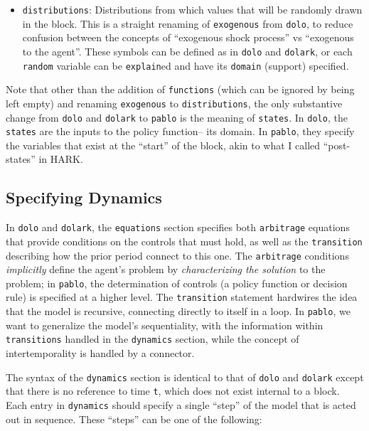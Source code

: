\documentclass[12pt,pdftex,letterpaper]{article}
\begin{document}
\begin{itemize}
	\item \texttt{distributions}: Distributions from which values that will be randomly drawn in the block. This is a straight renaming of \texttt{exogenous} from \texttt{dolo}, to reduce confusion between the concepts of ``exogenous shock process'' vs ``exogenous to the agent''. These symbols can be defined as in \texttt{dolo} and \texttt{dolark}, or each \texttt{random} variable can be \texttt{explain}ed and have its \texttt{domain} (support) specified.
\end{itemize}

Note that other than the addition of \texttt{functions} (which can be ignored by being left empty) and renaming \texttt{exogenous} to \texttt{distributions}, the only substantive change from \texttt{dolo} and \texttt{dolark} to \texttt{pablo} is the meaning of \texttt{states}. In \texttt{dolo}, the \texttt{states} are the inputs to the policy function-- its domain. In \texttt{pablo}, they specify the variables that exist at the ``start'' of the block, akin to what I called ``post-states'' in HARK.


\subsection{Specifying Dynamics}

In \texttt{dolo} and \texttt{dolark}, the \texttt{equations} section specifies both \texttt{arbitrage} equations that provide conditions on the controls that must hold, as well as the \texttt{transition} describing how the prior period connect to this one. The \texttt{arbitrage} conditions \textit{implicitly} define the agent's problem by \textit{characterizing the solution} to the problem; in \texttt{pablo}, the determination of controls (a policy function or decision rule) is specified at a higher level. The \texttt{transition} statement hardwires the idea that the model is recursive, connecting directly to itself in a loop. In \texttt{pablo}, we want to generalize the model's sequentiality, with the information within \texttt{transitions} handled in the \texttt{dynamics} section, while the concept of intertemporality is handled by a connector.

The syntax of the \texttt{dynamics} section is identical to that of \texttt{dolo} and \texttt{dolark} except that there is no reference to time \texttt{t}, which does not exist internal to a block. Each entry in \texttt{dynamics} should specify a single ``step'' of the model that is acted out in sequence. These ``steps'' can be one of the following:
\end{document}

